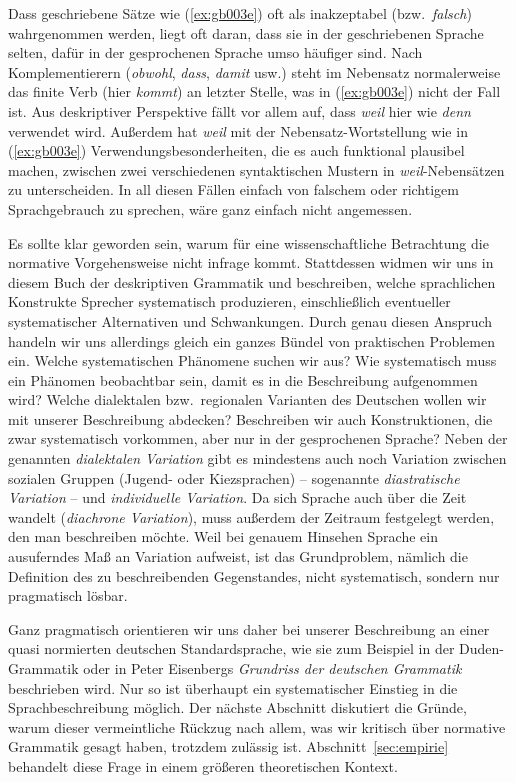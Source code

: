 Dass geschriebene Sätze wie (\ref{ex:gb003e}) oft als inakzeptabel (bzw.\ \textit{falsch}) wahrgenommen werden, liegt oft daran, dass sie in der geschriebenen Sprache selten, dafür in der gesprochenen Sprache umso häufiger sind.
Nach Komplementierern (\textit{obwohl}, \textit{dass}, \textit{damit} usw.) steht im Nebensatz normalerweise das finite Verb (hier \textit{kommt}) an letzter Stelle, was in (\ref{ex:gb003e}) nicht der Fall ist.
Aus deskriptiver Perspektive fällt vor allem auf, dass \textit{weil} hier wie \textit{denn} verwendet wird.
Außerdem hat \textit{weil} mit der Nebensatz-Wortstellung wie in (\ref{ex:gb003e}) Verwendungsbesonderheiten, die es auch funktional plausibel machen, zwischen zwei verschiedenen syntaktischen Mustern in \textit{weil}-Nebensätzen zu unterscheiden.
In all diesen Fällen einfach von falschem oder richtigem Sprachgebrauch zu sprechen, wäre ganz einfach nicht angemessen.

Es sollte klar geworden sein, warum für eine wissenschaftliche Betrachtung die normative Vorgehensweise nicht infrage kommt.
Stattdessen widmen wir uns in diesem Buch der deskriptiven Grammatik und beschreiben, welche sprachlichen Konstrukte Sprecher systematisch produzieren, einschließlich eventueller systematischer Alternativen und Schwankungen.
Durch genau diesen Anspruch handeln wir uns allerdings gleich ein ganzes Bündel von praktischen Problemen ein.
Welche systematischen Phänomene suchen wir aus?
Wie systematisch muss ein Phänomen beobachtbar sein, damit es in die Beschreibung aufgenommen wird?
Welche dialektalen bzw.\ regionalen Varianten des Deutschen wollen wir mit unserer Beschreibung abdecken?
Beschreiben wir auch Konstruktionen, die zwar systematisch vorkommen, aber nur in der gesprochenen Sprache?
Neben der genannten \textit{dialektalen Variation} gibt es mindestens auch noch Variation zwischen sozialen Gruppen (\zB Jugend- oder Kiezsprachen) -- sogenannte \textit{diastratische Variation} -- und \textit{individuelle Variation}.
Da sich Sprache auch über die Zeit wandelt (\textit{diachrone Variation}), muss außerdem der Zeitraum festgelegt werden, den man beschreiben möchte.
Weil bei genauem Hinsehen Sprache ein ausuferndes Maß an Variation aufweist, ist das Grundproblem, nämlich die Definition des zu beschreibenden Gegenstandes, nicht systematisch, sondern nur pragmatisch lösbar.

Ganz pragmatisch orientieren wir uns daher bei unserer Beschreibung an einer quasi normierten deutschen Standardsprache, wie sie zum Beispiel in der Duden-Grammatik \citep{Duden8} oder in Peter Eisenbergs \textit{Grundriss der deutschen Grammatik} \citep{Eisenberg2013a,Eisenberg2013b} beschrieben wird.
Nur so ist überhaupt ein systematischer Einstieg in die Sprachbeschreibung möglich.
Der nächste Abschnitt diskutiert die Gründe, warum dieser vermeintliche Rückzug nach allem, was wir kritisch über normative Grammatik gesagt haben, trotzdem zulässig ist.
Abschnitt~\ref{sec:empirie} behandelt diese Frage in einem größeren theoretischen Kontext.

